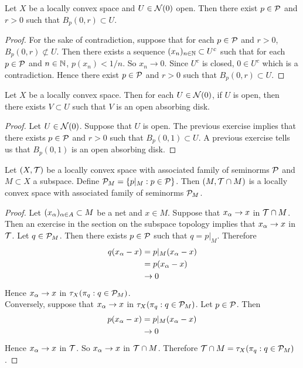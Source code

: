 \documentclass{book}
\begin{document}
	
	\begin{ex}
		Let $X$ be a locally convex space and $U \in \mathcal{N}(0)$ open. Then there exist $p \in \mathcal{P}$ and $r >0$ such that $B_p(0,r) \subset U$.
	\end{ex}

	\begin{proof}
		For the sake of contradiction, suppose that for each $p \in \mathcal{P}$ and $r >0$, $B_p(0,r) \not \subset U$. Then there exists a sequence $(x_n)_{n \in \mathbb{N}} \subset U^c$ such that for each $p \in \mathcal{P}$ and $n \in \mathbb{N}$, $p(x_n) < 1/n$. So $x_n \rightarrow 0$. Since $U^c$ is closed, $0 \in U^c$ which is a contradiction. Hence there exist $p \in \mathcal{P}$ and $r >0$ such that $B_p(0,r) \subset U$.
	\end{proof}

	\begin{ex}
		Let $X$ be a locally convex space. Then for each $U \in \mathcal{N}(0)$, if $U$ is open, then there exists $V \subset U$ such that $V$ is an open absorbing disk.
	\end{ex}

	\begin{proof}
		Let $U \in \mathcal{N}(0)$. Suppose that $U$ is open. The previous exercise implies that there exists $p \in \mathcal{P}$ and $r > 0$ such that $B_p(0,1) \subset U$. A previous exercise tells us that $B_p(0,1)$ is an open absorbing disk.
	\end{proof}

	\begin{ex}
		Let $(X, \mathcal{T})$ be a locally convex space with associated  family of seminorms $\mathcal{P}$ and $M \subset X$ a subspace. Define $\mathcal{P}_M = \{p|_M: p \in \mathcal{P}\}$. Then $(M, \mathcal{T} \cap M)$ is a locally convex space with associated family of seminorms $\mathcal{P}_M$. 
	\end{ex}

	\begin{proof}
		Let $(x_{\alpha})_{\alpha \in A} \subset M$ be a net and $x \in M$. Suppose that $x_{\alpha} \rightarrow x$ in $\mathcal{T} \cap M$. Then an exercise in the section on the subspace topology implies that $x_{\alpha} \rightarrow x$ in $\mathcal{T}$. Let $q \in \mathcal{P}_M$. Then there exists $p \in \mathcal{P}$ such that $q = p|_M$. Therefore
		\begin{align*}
			q(x_{\alpha} - x) 
			&= p|_M(x_{\alpha} - x) \\ 
			&= p(x_{\alpha} - x) \\
			& \rightarrow 0
		\end{align*}  
		Hence $x_{\alpha} \rightarrow x$ in $\tau_X(\pi_q:q \in \mathcal{P}_M)$. \\
		Conversely, suppose that $x_{\alpha} \rightarrow x$ in $\tau_X(\pi_q:q \in \mathcal{P}_M)$. Let $p \in \mathcal{P}$. Then 
		\begin{align*}
			p(x_{\alpha} - x) 
			&= p|_M(x_{\alpha} - x) \\
			& \rightarrow 0
		\end{align*}
		Hence $x_{\alpha} \rightarrow x$ in $\mathcal{T}$. So $x_{\alpha} \rightarrow x$ in $\mathcal{T} \cap M$. Therefore $\mathcal{T} \cap M = \tau_X(\pi_q: q \in \mathcal{P}_M)$. 
	\end{proof}
	
\end{document}
